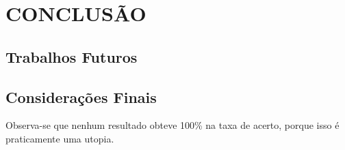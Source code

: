 
\chapter{CONCLUSÃO}
\label{chap:conclusao}

\section{Trabalhos Futuros}
\label{sec:trabalhos_futuros}

\section{Considerações Finais}
\label{sec:consideracoes_finais}

Observa-se que nenhum resultado obteve 100\% na taxa de acerto, porque isso é praticamente uma utopia.